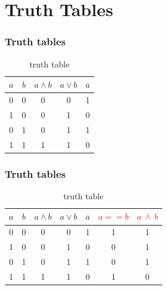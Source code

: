 \documentclass{beamer}
\begin{document}
\section{Truth Tables}
\begin{frame}\frametitle{Truth tables}
  \begin{table}[H]
  \centering
  \begin{tabular}{c|c|c|c|c}
  \textbf{$a$} & \textbf{$b$} & \textbf{$a\land b$} & \textbf{$a\lor b$} & \textbf{$\overline{a}$} \\ \hline
  0          & 0          & 0            & 0            & 1           \\
  1          & 0          & 0            & 1            & 0           \\
  0          & 1          & 0            & 1            & 1           \\
  1          & 1          & 1            & 1            & 0          
  \end{tabular}
  \caption{truth table}
  \label{tab:truth2}
  \end{table}
\end{frame}

\begin{frame}\frametitle{Truth tables}
   \begin{table}[H]
  \centering
  \begin{tabular}{c|c|c|c|c|c|c}
  \textbf{$a$} & \textbf{$b$} & \textbf{$a\land b$} & \textbf{$a\lor b$} & \textbf{$\overline{a}$} & \textbf{ \textcolor{red}{$a==b$}}  & \textbf{ \textcolor{red}{$a\ \overline{\land}\  b$}} \\ \hline
  0          & 0          & 0            & 0            & 1          & 1        & 1      \\
  1          & 0          & 0            & 1            & 0          & 0        & 1   \\
  0          & 1          & 0            & 1            & 1          & 0        & 1  \\
  1          & 1          & 1            & 1            & 0          & 1        & 0  
  \end{tabular}
  \caption{truth table}
  \label{tab:truth}
  \end{table}
\end{frame}
\end{document}
